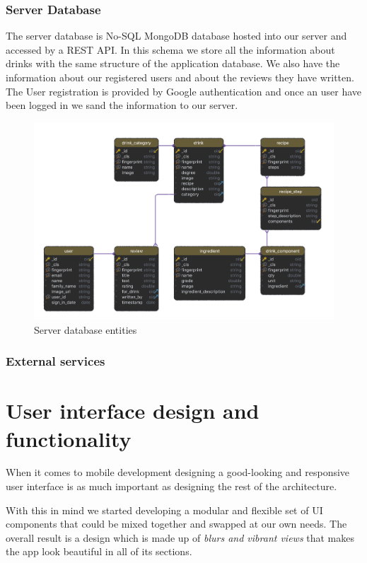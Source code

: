 \documentclass[paper=a4, fontsize=12pt]{scrartcl}
\numberwithin{equation}{section}		%
\numberwithin{figure}{section}			%
\numberwithin{table}{section}				%
\begin{document}
\subsubsection{Server Database}
The server database is No-SQL MongoDB database hosted into our server and accessed by a REST API. In this schema we store all the information about drinks with the same structure of the application database. We also have the information about our registered users and about the reviews they have written. The User registration is provided by Google authentication and once an user have been logged in we sand the information to our server.

\begin{figure}[H]
\begin{center}
    \includegraphics[width=\linewidth]{ServerDB.png}
    \caption{Server database entities}
    \label{ServerDB}
\end{center}
\end{figure}

\subsubsection{External services}\label{section:external services}

\section{User interface design and functionality}
When it comes to mobile development designing a good-looking and responsive user interface is as much important as designing the rest of the architecture. 

With this in mind we started developing a modular and flexible set of UI components that could be mixed together and swapped at our own needs. The overall result is a design which is made up of \textit{blurs and vibrant views} that makes the app look beautiful in all of its sections.
\end{document}
